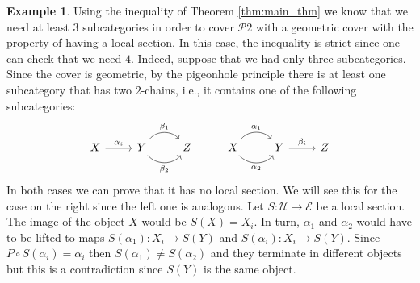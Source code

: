 \documentclass[12pt,reqno]{amsart}
\theoremstyle{definition}
\newtheorem{example}[teo]{Example}
\theoremstyle{remark}
\numberwithin{figure}{section}%
\newcommand{\E}{\mathcal{E}}
\newcommand{\Uc}{\mathcal{U}}
\begin{document}
\begin{example}
    Using the inequality of Theorem \ref{thm:main_thm} we know that we need at least $3$ subcategories in order to cover $\mathcal{P}2$ with a geometric cover with the property of having a local section. In this case, the inequality is strict since one can check that we need $4$. Indeed, suppose that we had only three subcategories. Since the cover is geometric, by the pigeonhole principle there is at least one subcategory that has two $2$-chains, i.e., it contains one of the following subcategories:
    $$
\begin{tikzcd}
X \arrow[r, "\alpha_i"] & Y \arrow[r, "\beta_2"', bend right=49] \arrow[r, "\beta_1", bend left=49] & Z & X \arrow[r, "\alpha_1", bend left=49] \arrow[r, "\alpha_2"', bend right=49] & Y \arrow[r, "\beta_i"] & Z
\end{tikzcd}
    $$
    In both cases we can prove that it has no local section. We will see this for the case on the right since the left one is analogous. Let $S \colon \Uc \rightarrow \E $ be a local section. The image of the object $X$ would be $S(X)=X_i$. In turn, $\alpha_1$ and $\alpha_2$ would have to be lifted to maps $S(\alpha_1) \colon X_i \rightarrow S(Y)$ and $S(\alpha_i) \colon X_i \rightarrow S(Y)$. Since $P \circ S(\alpha_i)=\alpha_i$ then $S(\alpha_1)\neq S(\alpha_2)$ and they terminate in different objects but this is a contradiction since $S(Y)$ is the same object.
\end{example}










%

\end{document}

